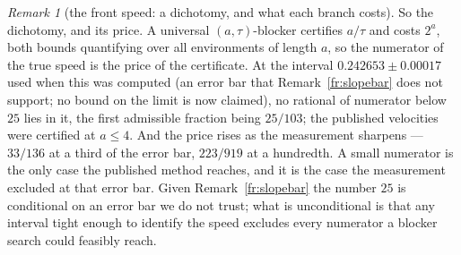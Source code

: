 \documentclass[11pt]{article}
\theoremstyle{definition}
\theoremstyle{remark}
\newtheorem{remark}[theorem]{Remark}
\begin{document}
\begin{remark}[the front speed: a dichotomy, and what each branch costs]
So the dichotomy, and its price. A universal $(a,\tau)$-blocker certifies $a/\tau$ and costs $2^{a}$,
both bounds quantifying over all environments of length $a$, so the numerator of the true speed is the
price of the certificate. At the interval $0.242653\pm0.00017$ used when this was computed (an error bar that
Remark~\ref{fr:slopebar} does not support; no bound on the limit is now claimed), no rational of numerator below $25$ lies in it, the
first admissible fraction being $25/103$; the published velocities were certified at $a\le4$. And the
price rises as the measurement sharpens --- $33/136$ at a third of the error bar, $223/919$ at a
hundredth. A small numerator is the only case the published method reaches, and it is the case the
measurement excluded at that error bar. Given Remark~\ref{fr:slopebar} the number $25$ is conditional on an error bar we
do not trust; what is unconditional is that any interval tight enough to identify the speed excludes
every numerator a blocker search could feasibly reach.

\end{remark}
\end{document}
